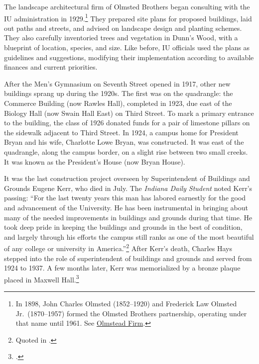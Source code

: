 \documentclass[
  american,
  letterpaper,
]{scrreprt}
\begin{document}
The landscape architectural firm of Olmsted Brothers began consulting
with the IU administration in 1929.\footnote{In 1898, John Charles
  Olmsted (1852--1920) and Frederick Law Olmsted Jr.~(1870--1957) formed
  the Olmsted Brothers partnership, operating under that name until
  1961. See
  \href{http://www.olmsted.org/the-olmsted-legacy/the-olmsted-firm/an-introduction}{Olmstead
  Firm}.} They prepared site plans for proposed buildings, laid out
paths and streets, and advised on landscape design and planting schemes.
They also carefully inventoried trees and vegetation in Dunn's Wood,
with a blueprint of location, species, and size. Like before, IU
officials used the plans as guidelines and suggestions, modifying their
implementation according to available finances and current priorities.

After the Men's Gymnasium on Seventh Street opened in 1917, other new
buildings sprang up during the 1920s. The first was on the quadrangle:
the Commerce Building (now Rawles Hall), completed in 1923, due east of
the Biology Hall (now Swain Hall East) on Third Street. To mark a
primary entrance to the building, the class of 1926 donated funds for a
pair of limestone pillars on the sidewalk adjacent to Third Street. In
1924, a campus home for President Bryan and his wife, Charlotte Lowe
Bryan, was constructed. It was east of the quadrangle, along the campus
border, on a slight rise between two small creeks. It was known as the
President's House (now Bryan House).

It was the last construction project overseen by Superintendent of
Buildings and Grounds Eugene Kerr, who died in July. The \emph{Indiana
Daily Student} noted Kerr's passing: ``For the last twenty years this
man has labored earnestly for the good and advancement of the
University. He has been instrumental in bringing about many of the
needed improvements in buildings and grounds during that time. He took
deep pride in keeping the buildings and grounds in the best of
condition, and largely through his efforts the campus still ranks as one
of the most beautiful of any college or university in
America.''\footnote{Quoted in .} After Kerr's death, Charles Hays stepped into the role
of superintendent of buildings and grounds and served from 1924 to 1937.
A few months later, Kerr was memorialized by a bronze plaque placed in
Maxwell Hall.\footnote{.}
\end{document}
